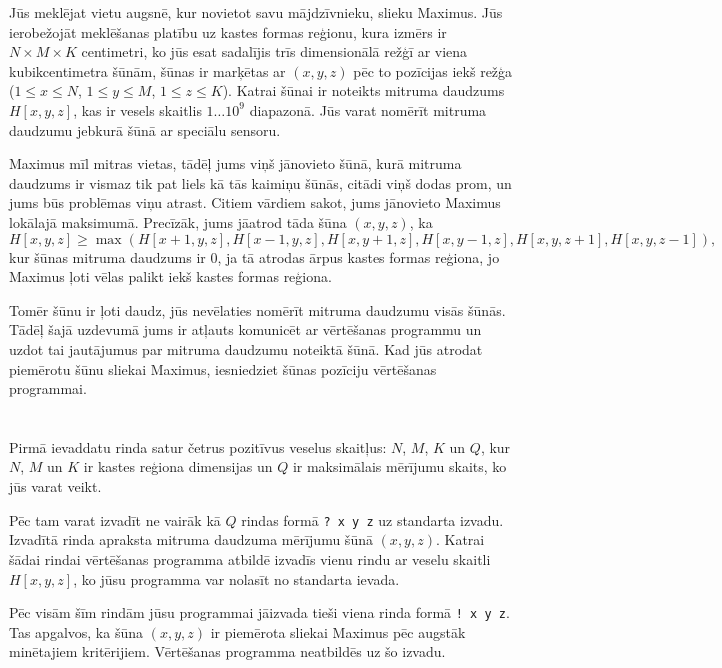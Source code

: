 \ifx\boi\undefined\fi
\def\version{jury-1}

Jūs meklējat vietu augsnē, kur novietot savu mājdzīvnieku, slieku Maximus.
Jūs ierobežojāt meklēšanas platību uz kastes formas reģionu, kura izmērs ir $N \times M \times K$ centimetri,
ko jūs esat sadalījis trīs dimensionālā režģī ar viena kubikcentimetra šūnām,
šūnas ir marķētas ar $(x, y, z)$ pēc to pozīcijas iekš režģa ($1 \le x \le N$, $1 \le y \le M$, $1 \le z \le K$).
Katrai šūnai ir noteikts mitruma daudzums $H[x,y,z]$, kas ir vesels skaitlis $1 \dots 10^9$ diapazonā.
Jūs varat nomērīt mitruma daudzumu jebkurā šūnā ar speciālu sensoru.

Maximus mīl mitras vietas, tādēļ jums viņš jānovieto šūnā, kurā mitruma daudzums ir vismaz tik pat liels kā tās kaimiņu šūnās,
citādi viņš dodas prom, un jums būs problēmas viņu atrast.
Citiem vārdiem sakot, jums jānovieto Maximus lokālajā maksimumā.
Precīzāk, jums jāatrod tāda šūna $(x,y,z)$, ka
$$
H[x,y,z] \ge \max(H[x+1,y,z], H[x-1,y,z], H[x,y+1,z], H[x,y-1,z], H[x,y,z+1], H[x,y,z-1]),
$$
kur šūnas mitruma daudzums ir $0$, ja tā atrodas ārpus kastes formas reģiona, jo Maximus ļoti vēlas palikt iekš kastes formas reģiona.

Tomēr šūnu ir ļoti daudz, jūs nevēlaties nomērīt mitruma daudzumu visās šūnās.
Tādēļ šajā uzdevumā jums ir atļauts komunicēt ar vērtēšanas programmu un uzdot tai jautājumus par mitruma daudzumu noteiktā šūnā.
Kad jūs atrodat piemērotu šūnu sliekai Maximus, iesniedziet šūnas pozīciju vērtēšanas programmai.

\section*{\interactivity}
Pirmā ievaddatu rinda satur četrus pozitīvus veselus skaitļus: $N$, $M$, $K$ un $Q$,
kur $N$, $M$ un $K$ ir kastes reģiona dimensijas un $Q$ ir maksimālais mērījumu skaits, ko jūs varat veikt.

Pēc tam varat izvadīt ne vairāk kā $Q$ rindas formā \texttt{?\ x y z} uz standarta izvadu.
Izvadītā rinda apraksta mitruma daudzuma mērījumu šūnā $(x, y, z)$.
Katrai šādai rindai vērtēšanas programma atbildē izvadīs vienu rindu ar veselu skaitli $H[x,y,z]$,
ko jūsu programma var nolasīt no standarta ievada.

Pēc visām šīm rindām jūsu programmai jāizvada tieši viena rinda formā \texttt{!\ x y z}.
Tas apgalvos, ka šūna $(x, y, z)$ ir piemērota sliekai Maximus pēc augstāk minētajiem kritērijiem.
Vērtēšanas programma neatbildēs uz šo izvadu.

